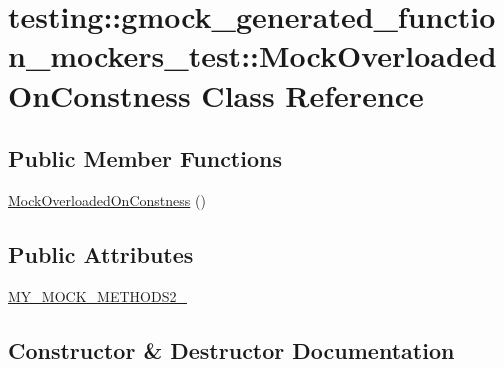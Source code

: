 \hypertarget{classtesting_1_1gmock__generated__function__mockers__test_1_1MockOverloadedOnConstness}{}\section{testing\+::gmock\+\_\+generated\+\_\+function\+\_\+mockers\+\_\+test\+::Mock\+Overloaded\+On\+Constness Class Reference}
\label{classtesting_1_1gmock__generated__function__mockers__test_1_1MockOverloadedOnConstness}
\subsection*{Public Member Functions}
\begin{DoxyCompactItemize}
\item 
\mbox{\hyperlink{classtesting_1_1gmock__generated__function__mockers__test_1_1MockOverloadedOnConstness_a83e2840ed88fe4a01a878c3bb529d793}{Mock\+Overloaded\+On\+Constness}} ()
\end{DoxyCompactItemize}
\subsection*{Public Attributes}
\begin{DoxyCompactItemize}
\item 
\mbox{\hyperlink{classtesting_1_1gmock__generated__function__mockers__test_1_1MockOverloadedOnConstness_a3447041442c4ca64d597186e894b307d}{M\+Y\+\_\+\+M\+O\+C\+K\+\_\+\+M\+E\+T\+H\+O\+D\+S2\+\_\+}}
\end{DoxyCompactItemize}


\subsection{Constructor \& Destructor Documentation}
\mbox{\label{classtesting_1_1gmock__generated__function__mockers__test_1_1MockOverloadedOnConstness_a83e2840ed88fe4a01a878c3bb529d793}} 
